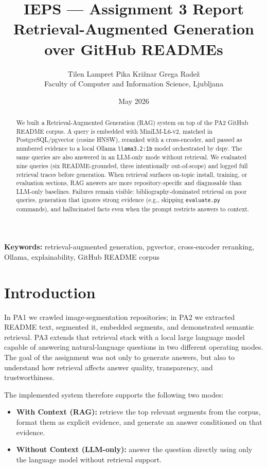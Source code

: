 \documentclass[11pt,a4paper]{article}
\title{\vspace{-1.2cm}\textbf{\Large IEPS --- Assignment 3 Report}\\[0.3em]
\large Retrieval-Augmented Generation over GitHub READMEs\vspace{-0.2cm}}
\author{Tilen Lampret \quad Pika Kri\v{z}nar \quad Grega Rade\v{z}\\Faculty of Computer and Information Science, Ljubljana}
\date{May 2026}
\begin{document}
\maketitle
\small

\begin{abstract}
We built a Retrieval-Augmented Generation (RAG) system on top of the PA2 GitHub README corpus. A query is embedded with MiniLM-L6-v2, matched in PostgreSQL/pgvector (cosine HNSW), reranked with a cross-encoder, and passed as numbered evidence to a local Ollama \texttt{llama3.2:1b} model orchestrated by dspy. The same queries are also answered in an LLM-only mode without retrieval. We evaluated nine queries (six README-grounded, three intentionally out-of-scope) and logged full retrieval traces before generation. When retrieval surfaces on-topic install, training, or evaluation sections, RAG answers are more repository-specific and diagnosable than LLM-only baselines. Failures remain visible: bibliography-dominated retrieval on poor queries, generation that ignores strong evidence (e.g., skipping \texttt{evaluate.py} commands), and hallucinated facts even when the prompt restricts answers to context.
\end{abstract}

\noindent\textbf{Keywords:} retrieval-augmented generation, pgvector, cross-encoder reranking, Ollama, explainability, GitHub README corpus

\section{Introduction}
In PA1 we crawled image-segmentation repositories; in PA2 we extracted README text, segmented it, embedded segments, and demonstrated semantic retrieval. PA3 extends that retrieval stack with a local large language model capable of answering natural-language questions in two different operating modes. The goal of the assignment was not only to generate answers, but also to understand how retrieval affects answer quality, transparency, and trustworthiness.

The implemented system therefore supports the following two modes:

\begin{itemize}
  \item \textbf{With Context (RAG):} retrieve the top relevant segments from the corpus, format them as explicit evidence, and generate an answer conditioned on that evidence.
  \item \textbf{Without Context (LLM-only):} answer the question directly using only the language model without retrieval support.
\end{itemize}
\end{document}
